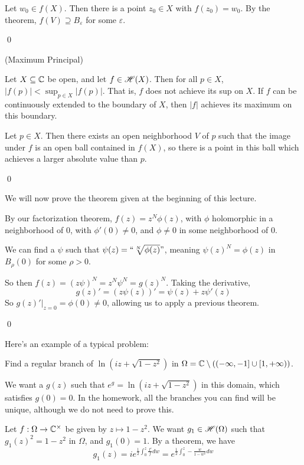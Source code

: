 \documentclass[x11names,reqno,14pt]{extarticle}
\newcommand{\oo}{{\infty}}
\begin{document}
\proof

Let $w_0 \in f(X)$. Then there is a point $z_0 \in X$ with $f(z_0) = w_0$. By the theorem, $f(V) \supseteq B_{\varepsilon}$ for some $\varepsilon$. 

\qed

\cor (Maximum Principal)

Let $X \subseteq \mathbb{C}$ be open, and let $f \in \mathscr{H}(X)$. Then for all $p \in X$, $|f(p)| < \sup_{p\in X}|f(p)|$. That is, $f$ does not achieve its sup on $X$. If $f$ can be continuously extended to the boundary of $X$, then $|f|$ achieves its maximum on this boundary. 

\proof

Let $p \in X$. Then there exists an open neighborhood $V$ of $p$ such that the image under $f$ is an open ball contained in $f(X)$, so there is a point in this ball which achieves a larger absolute value than $p$. 

\qed

We will now prove the theorem given at the beginning of this lecture. 

\proof

By our factorization theorem, $f(z) = z^N\phi(z)$, with $\phi$ holomorphic in a neighborhood of $0$, with $\phi'(0) \neq 0$, and $\phi\neq0$ in some neighborhood of $0$. 

We can find a $\psi$ such that $\psi(z) = ``\sqrt[N]{\phi(z)}"$, meaning $\psi(z)^N = \phi(z)$ in $B_\rho(0)$ for some $\rho>0$. 

So then $f(z) = (z\psi)^N = z^N\psi^N = g(z)^N$. Taking the derivative, 
\[
g(z)' = (z\psi(z))' = \psi(z) + z\psi'(z)
\]
So $g(z)'|_{z = 0} = \phi(0)\neq0$, allowing us to apply a previous theorem.

\qed

Here's an example of a typical problem: 

\exm

Find a regular branch of $\ln(iz + \sqrt{1 - z^2})$ in $\Omega = \C\setminus((-\oo, -1]\cup[1, +\oo))$. 

We want a $g(z)$ such that $e^g = \ln(iz + \sqrt{1 -z^2})$ in this domain, which satisfies $g(0) = 0$. In the homework, all the branches you can find will be unique, although we do not need to prove this. 

Let $f:\Omega\to \mathbb{C}^\times$ be given by $z\mapsto 1- z^2$. We want  $g_1 \in \mathscr{H}(\Omega)$ such that $g_1(z)^2 = 1 - z^2$ in $\Omega$, and $g_1(0) = 1$. By a theorem, we have
\[
g_1(z) = ie^{\frac{1}{2}\int_0^z\frac{f'}{f}dw} = e^{\frac{1}{2}\int_0^z-\frac{w}{1 - w^2}dw}
\]
\end{document}
